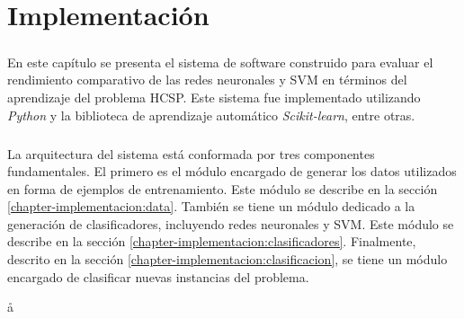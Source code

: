 \chapter{Implementación} \label{chapter-implementation}

\paragraph{} En este capítulo se presenta el sistema de software construido para evaluar el rendimiento comparativo de las redes neuronales y SVM en términos del aprendizaje del problema HCSP.
Este sistema fue implementado utilizando \textit{Python} y la biblioteca de aprendizaje automático \textit{Scikit-learn}, entre otras.

\paragraph{} La arquitectura del sistema está conformada por tres componentes fundamentales.
El primero es el módulo encargado de generar los datos utilizados en forma de ejemplos de entrenamiento.
Este módulo se describe en la sección \ref{chapter-implementacion:data}.
También se tiene un módulo dedicado a la generación de clasificadores, incluyendo redes neuronales y SVM.
Este módulo se describe en la sección \ref{chapter-implementacion:clasificadores}.
Finalmente, descrito en la sección \ref{chapter-implementacion:clasificacion}, se tiene un módulo encargado de clasificar nuevas instancias del problema.

å




